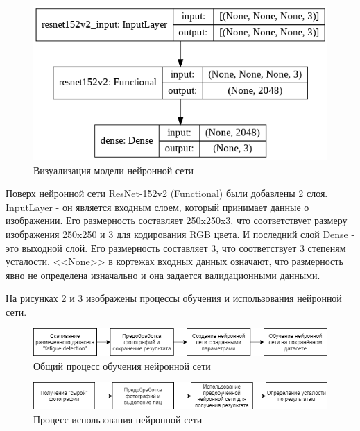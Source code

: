 \documentclass[12pt, letterpaper]{article}
\begin{document}
    \begin{figure}[H]
        \centering
        \includegraphics[width=1\linewidth]{model.png}
        \caption{Визуализация модели нейронной сети}
        \label{fig:model}
    \end{figure}
    
    Поверх нейронной сети ResNet-152v2 (Functional) были добавлены 2 слоя. InputLayer - он является входным слоем, который принимает данные о изображении. Его размерность составляет 250x250x3, что соответствует размеру изображения 250x250 и 3 для кодирования RGB цвета.
    И последний слой Dense - это выходной слой. Его размерность составляет 3, что соответствует 3 степеням усталости.
    <<None>> в кортежах входных данных означают, что размерность явно не определена изначально и она задается валидационными данными.
    
    На рисунках \ref{fig:ResNet_train} и \ref{fig:ResNet_use} изображены процессы обучения и использования нейронной сети.
    
     \begin{figure}[H]
        \centering
    \includegraphics[width=1\linewidth]{ResNet_train.png}
        \caption{Общий процесс обучения нейронной сети}
        \label{fig:ResNet_train}
    \end{figure}
    
    \begin{figure}[H]
        \centering
        \includegraphics[width=1\linewidth]{ResNet_use.png}
        \caption{Процесс использования нейронной сети}
        \label{fig:ResNet_use}
    \end{figure}
\end{document}
